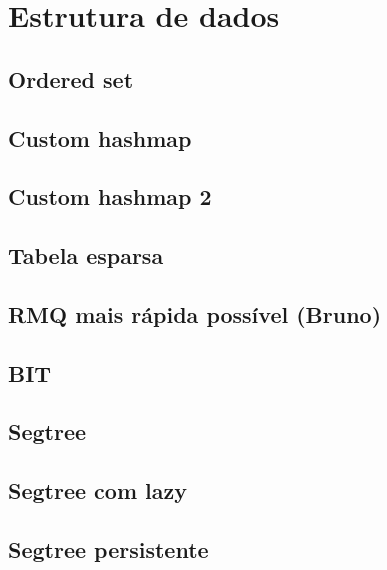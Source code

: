 \section{Estrutura de dados}

\subsection{Ordered set}


\subsection{Custom hashmap}


\subsection{Custom hashmap 2}


\subsection{Tabela esparsa}


\subsection{RMQ mais rápida possível (Bruno)}


\subsection{BIT}


\subsection{Segtree}


\subsection{Segtree com lazy}


\subsection{Segtree persistente}

